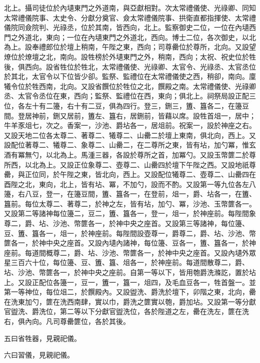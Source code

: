 \begin{pinyinscope}
北上。攝司徒位於內壝東門之外道南，與亞獻相對。次太常禮儀使、光祿卿、同知太常禮儀院事、太史令、分獻分奠官、僉太常禮儀院事、拱衛直都指揮使、太常禮儀院同僉院判、光祿丞，位於其南，皆西向，北上。監察御史二位，一位在內壝西門之外道北，東向；一位在內壝東門之外道北，西向。博士二位，各次御史，以北為上。設奉禮郎位於壇上稍南，午陛之東，西向；司尊罍位於尊所，北向。又設望燎位於燎壇之北，南向。設牲榜於外壝東門之外，稍南，西向；太祝、祝史位於牲後，俱西向。設省牲位於牲北，太常禮儀使、光祿卿、太官令、光祿丞、太官丞位於其北，太官令以下位皆少卻。監祭、監禮位在太常禮儀使之西，稍卻，南向。廩犧令位於牲西南，北向。又設省饌位於牲位之北，饌殿之南。太常禮儀使、光祿卿丞、太官令丞位在東，西向；監祭、監禮位在西，東向；俱北上。祠祭局設正配三位，各左十有二籩，右十有二豆，俱為四行。登三，鉶三，簠、簋各二，在籩豆間。登居神前，鉶又居前，簠左、簋右，居鉶前，皆藉以席。設牲首俎一，居中；牛羊豕俎七，次之。香案一，沙池、爵坫各一，居俎前。祝案一，設於神座之右。又設天地二位各太尊二、著尊二、犧尊二、山罍二於壇上東南，俱北向，西上。又設配位著尊二、犧尊二、象尊二、山罍二，在二尊所之東，皆有坫，加勺冪，惟玄酒有冪無勺，以北為上。馬湩三器，各設於尊所之首，加冪勺。又設玉幣篚二於尊所西，以北為上。又設正位象尊二、壺尊二、山罍四於壇下午陛之西。又設地祇尊罍，與正位同，於午陛之東，皆北向，西上。又設配位犧尊二、壺尊二、山罍四在酉陛之北，東向，北上，皆有坫、冪，不加勺，設而不酌。又設第一等九位各左八籩，右八豆，登一，在籩豆間，簠、簋各一，在登前，俎一，爵、坫各一，在簠、簋前。每位太尊二、著尊二，於神之左，皆有坫，加勺、冪，沙池、玉幣篚各一。又設第二等諸神每位籩二，豆二，簠、簋各一，登一，俎一，於神座前。每陛間象尊二，爵、坫、沙池、幣篚各一，於神中央之座首。又設第三等諸神，每位籩、豆、簠、簋各一，俎一，於神座前。每陛間設壺尊一，爵尊二，爵、坫、沙池、幣篚各一，於神中央之座首。又設內壝內諸神，每位籩、豆各一，簠、簋各一，於神座前。每道間概尊二，爵、坫、沙池、幣篚各一，於神中央之座首。又設內壝外眾星三百六十位，每位籩、豆、簠、簋、俎各一，於神座前。每道間散尊二，爵、坫、沙池、幣篚各一，於神中央之座前。自第一等以下，皆用匏爵洗滌訖，置於坫上。又設正配位各籩一，豆一，簠一，簋一，俎四，及毛血豆各一，牲首盤一。並第一等神位，每位俎二，於饌殿內。又設盥洗、爵洗於壇下，卯階之東，北向，罍在洗東加勺，篚在洗西南肆，實以巾，爵洗之篚實以匏，爵加坫。又設第一等分獻官盥洗、爵洗位，第二等以下分獻官盥洗位，各於陛道之左，罍在洗左，篚在洗右，俱內向。凡司尊罍篚位，各於其後。



 五曰省牲器，見親祀儀。



 六曰習儀，見親祀儀。




\end{pinyinscope}
